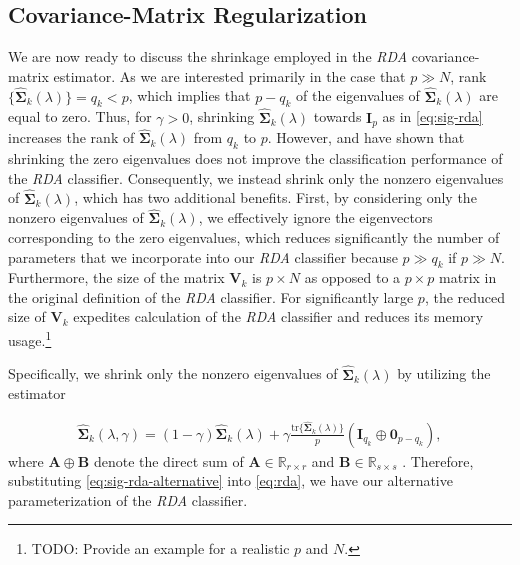 \documentclass[11pt]{article}
\newcommand{\tr}{\text{tr}}
\begin{document}
\subsection{Covariance-Matrix Regularization}

We are now ready to discuss the shrinkage employed in the \emph{RDA} covariance-matrix estimator. As we are interested primarily in the case that $p \gg N$, rank$\{\widehat{\bm\Sigma}_k(\lambda)\} = q_k < p$, which implies that $p - q_k$ of the eigenvalues of $\widehat{\bm\Sigma}_k(\lambda)$ are equal to zero. Thus, for $\gamma > 0$, shrinking $\widehat{\bm\Sigma}_k(\lambda)$ towards $\bm I_p$ as in \eqref{eq:sig-rda} increases the rank of $\widehat{\bm\Sigma}_k(\lambda)$ from $q_k$ to $p$. However, \cite{Ye:2009gd} and \cite{YeOtherPaperCitedInTheFirst} have shown that shrinking the zero eigenvalues does not improve the classification performance of the \emph{RDA} classifier. Consequently, we instead shrink only the nonzero eigenvalues of $\widehat{\bm\Sigma}_k(\lambda)$, which has two additional benefits. First, by considering only the nonzero eigenvalues of $\widehat{\bm\Sigma}_k(\lambda)$, we effectively ignore the eigenvectors corresponding to the zero eigenvalues, which reduces significantly the number of parameters that we incorporate into our \emph{RDA} classifier because $p \gg q_k$ if $p \gg N$. Furthermore, the size of the matrix $\bm V_k$ is $p \times N$ as opposed to a $p \times p$ matrix in the original definition of the \emph{RDA} classifier. For significantly large $p$, the reduced size of $\bm V_k$ expedites calculation of the \emph{RDA} classifier and reduces its memory usage.\footnote{TODO: Provide an example for a realistic $p$ and $N$.}

Specifically, we shrink only the nonzero eigenvalues of $\widehat{\bm \Sigma}_k(\lambda)$ by utilizing the estimator

\begin{align}
	\widehat{\bm\Sigma}_k(\lambda, \gamma) = (1 - \gamma) \widehat{\bm\Sigma}_k(\lambda) + \gamma \frac{\tr\{\widehat{\bm\Sigma}_k(\lambda)\}}{p} (\bm I_{q_k} \oplus \bm 0_{p - q_k}),\label{eq:sig-rda-alternative}
\end{align}
where $\bm A \oplus \bm B$ denote the direct sum of $\bm A \in \mathbb{R}_{r \times r}$ and $\bm B \in \mathbb{R}_{s \times s}$ \citep[Chapter 1]{Lutkepohl:1996uz}. Therefore, substituting \eqref{eq:sig-rda-alternative} into \eqref{eq:rda}, we have our alternative parameterization of the \emph{RDA} classifier.



\end{document}
